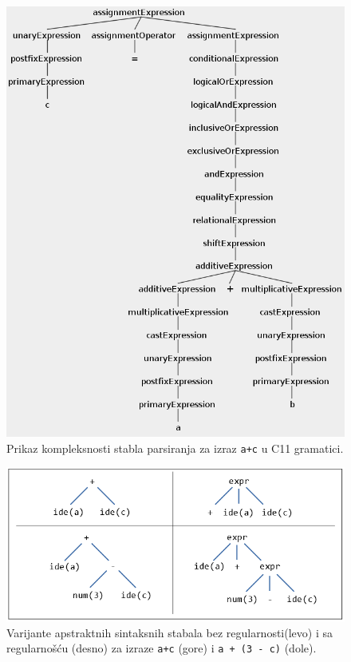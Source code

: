 \begin{figure}[h!]
    \centering
    \includegraphics[scale=0.6]{images/parse_tree_expr.png}
    \caption{Prikaz kompleksnosti stabla parsiranja za izraz 
    \texttt{a+c} u C11 gramatici.} 
    \label{fig:CompilationProcessPars1}
\end{figure}

\begin{figure}[h!]
    \centering
    \includegraphics[scale=0.8]{images/ast.png}
    \caption{Varijante apstraktnih sintaksnih stabala bez regularnosti(levo) i sa regularnošću (desno) za izraze \texttt{a+c} (gore) i \texttt{a + (3 - c)} (dole).} 
    \label{fig:ASTVariants}
\end{figure}

